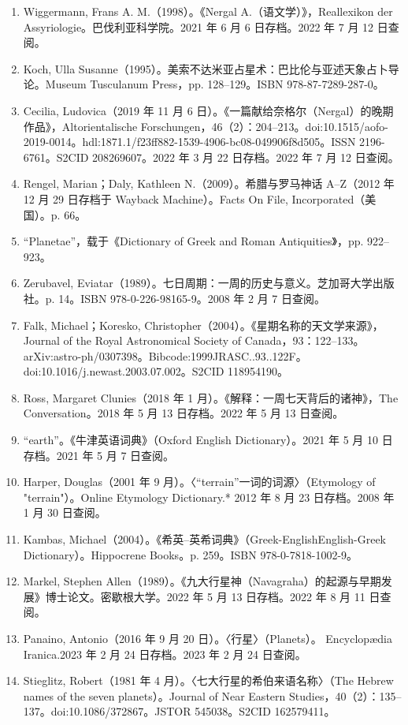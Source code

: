 \begin{enumerate}
\item Wiggermann, Frans A. M.（1998）。《Nergal A.（语文学）》，Reallexikon der Assyriologie。巴伐利亚科学院。2021 年 6 月 6 日存档。2022 年 7 月 12 日查阅。
\item Koch, Ulla Susanne（1995）。美索不达米亚占星术：巴比伦与亚述天象占卜导论。Museum Tusculanum Press，pp. 128–129。ISBN 978-87-7289-287-0。
\item Cecilia, Ludovica（2019 年 11 月 6 日）。《一篇献给奈格尔（Nergal）的晚期作品》，Altorientalische Forschungen，46（2）：204–213。doi:10.1515/aofo-2019-0014。hdl:1871.1/f23ff882-1539-4906-bc08-049906f8d505。ISSN 2196-6761。S2CID 208269607。2022 年 3 月 22 日存档。2022 年 7 月 12 日查阅。
\item Rengel, Marian；Daly, Kathleen N.（2009）。希腊与罗马神话 A–Z（2012 年 12 月 29 日存档于 Wayback Machine）。Facts On File, Incorporated（美国）。p. 66。
\item “Planetae”，载于《Dictionary of Greek and Roman Antiquities》，pp. 922–923。
\item Zerubavel, Eviatar（1989）。七日周期：一周的历史与意义。芝加哥大学出版社。p. 14。ISBN 978-0-226-98165-9。2008 年 2 月 7 日查阅。
\item Falk, Michael；Koresko, Christopher（2004）。《星期名称的天文学来源》，Journal of the Royal Astronomical Society of Canada，93：122–133。arXiv:astro-ph/0307398。Bibcode:1999JRASC..93..122F。doi:10.1016/j.newast.2003.07.002。S2CID 118954190。
\item Ross, Margaret Clunies（2018 年 1 月）。《解释：一周七天背后的诸神》，The Conversation。2018 年 5 月 13 日存档。2022 年 5 月 13 日查阅。
\item “earth”。《牛津英语词典》（Oxford English Dictionary）。2021 年 5 月 10 日存档。2021 年 5 月 7 日查阅。
\item Harper, Douglas（2001 年 9 月）。〈“terrain”一词的词源〉（Etymology of "terrain"）。Online Etymology Dictionary.* 2012 年 8 月 23 日存档。2008 年 1 月 30 日查阅。
\item Kambas, Michael（2004）。《希英–英希词典》（Greek-EnglishEnglish-Greek Dictionary）。Hippocrene Books。p. 259。ISBN 978-0-7818-1002-9。
\item Markel, Stephen Allen（1989）。《九大行星神（Navagraha）的起源与早期发展》博士论文。密歇根大学。2022 年 5 月 13 日存档。2022 年 8 月 11 日查阅。
\item Panaino, Antonio（2016 年 9 月 20 日）。〈行星〉（Planets）。
Encyclopædia Iranica.2023 年 2 月 24 日存档。2023 年 2 月 24 日查阅。
\item Stieglitz, Robert（1981 年 4 月）。〈七大行星的希伯来语名称〉（The Hebrew names of the seven planets）。Journal of Near Eastern Studies，40（2）：135–137。doi:10.1086/372867。JSTOR 545038。S2CID 162579411。

\end{enumerate}
